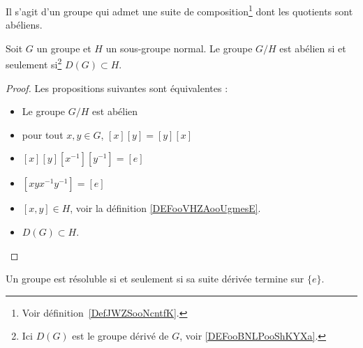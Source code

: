Il s'agit d'un groupe qui admet une suite de composition\footnote{Voir définition~\ref{DefJWZSooNcntfK}.} dont les quotients sont abéliens.

\begin{lemma}   \label{LemOARMooYhYmbH}
	Soit \( G\) un groupe et \( H\) un sous-groupe normal. Le groupe \( G/H\) est abélien si et seulement si\footnote{Ici \( D(G)\) est le groupe dérivé de \( G\), voir \ref{DEFooBNLPooShKYXa}.} \( D(G)\subset H\).
\end{lemma}

\begin{proof}
	Les propositions suivantes sont équivalentes :
	\begin{itemize}
		\item Le groupe \( G/H\) est abélien
		\item pour tout \( x,y\in G\), \( [x][y]=[y][x]\)
		\item \( [x][y][x^{-1}][y^{-1}]=[e]\)
		\item \( [xyx^{-1}y^{-1}] =[e]\)
		\item \( [x,y]\in H\), voir la définition  \ref{DEFooVHZAooUgmesE}.
		\item \( D(G)\subset H\).
	\end{itemize}
\end{proof}

\begin{proposition} \label{PropRWYZooTarnmm}
	Un groupe est résoluble si et seulement si sa suite dérivée termine sur \( \{ e \}\).
\end{proposition}

